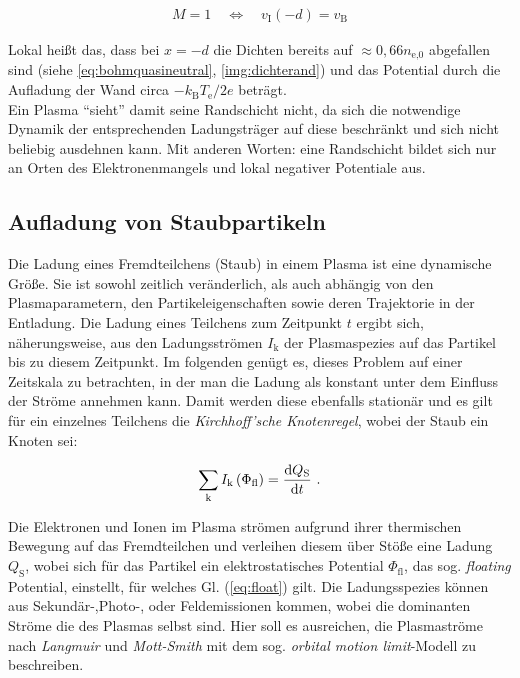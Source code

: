 \documentclass[numbers=noenddot,a4paper]{scrartcl}
\newcommand{\diff}{\textnormal{d}}
\newcommand{\ix}[1]{_\text{#1}}
\newcommand{\tilt}[1]{\textit{#1}}
\begin{document}
				\begin{align}
					M=1 \quad \Leftrightarrow \quad v\ix{I}\left(-d\right)=v\ix{B} \label{eq:bohmkritzwei}
				\end{align}

			Lokal heißt das, dass bei $x=-d$ die Dichten bereits auf $\approx0,66n\ix{e,0}$ abgefallen sind (siehe \ref{eq:bohmquasineutral}, \ref{img:dichterand}) und das Potential durch die Aufladung der Wand circa $-k\ix{B}T\ix{e}/2e$ beträgt.\\
			Ein Plasma "`sieht"' damit seine Randschicht nicht, da sich die notwendige Dynamik der entsprechenden Ladungsträger auf diese beschränkt und sich nicht beliebig ausdehnen kann. Mit anderen Worten: eine Randschicht bildet sich nur an Orten des Elektronenmangels und lokal negativer Potentiale aus.

		\subsection{Aufladung von Staubpartikeln}\label{sub:ströme}

			Die Ladung eines Fremdteilchens (Staub) in einem Plasma ist eine dynamische Größe. Sie ist sowohl zeitlich veränderlich, als auch abhängig von den Plasmaparametern, den Partikeleigenschaften sowie deren Trajektorie in der Entladung. Die Ladung eines Teilchens zum Zeitpunkt $t$ ergibt sich, näherungsweise, aus den Ladungsströmen $I\ix{k}$ der Plasmaspezies auf das Partikel bis zu diesem Zeitpunkt. Im folgenden genügt es, dieses Problem auf einer Zeitskala zu betrachten, in der man die Ladung als konstant unter dem Einfluss der Ströme annehmen kann. Damit werden diese ebenfalls stationär und es gilt für ein einzelnes Teilchens die \tilt{Kirchhoff'sche Knotenregel}, wobei der Staub ein Knoten sei:

				\begin{align}
					\sum_{\text{k}} I\ix{k}\left(\Phi\ix{fl}\right)=\frac{\diff Q\ix{S}}{\diff t} \,\, . \label{eq:float}
				\end{align}

		Die Elektronen und Ionen im Plasma strömen aufgrund ihrer thermischen Bewegung auf das Fremdteilchen und verleihen diesem über Stöße eine Ladung $Q\ix{S}$, wobei sich für das Partikel ein elektrostatisches Potential $\Phi\ix{fl}$, das sog. \tilt{floating} Potential, einstellt, für welches Gl. (\ref{eq:float}) gilt. Die Ladungsspezies können aus Sekundär-,Photo-, oder Feldemissionen kommen, wobei die dominanten Ströme die des Plasmas selbst sind. Hier soll es ausreichen, die Plasmaströme nach  \tilt{Langmuir} und \tilt{Mott-Smith} mit dem sog. \tilt{orbital motion limit}-Modell \cite{Langmuir26} zu beschreiben. 
\end{document}
